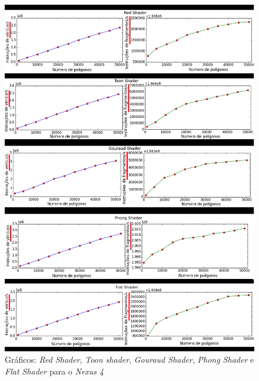 	\begin{figure}[hb]
	\centering
		\includegraphics[keepaspectratio=true,scale=0.55]{figuras/red_pt.png}
	\caption{Gráficos: \textit{Red Shader}, \textit{Toon shader}, \textit{Gouraud Shader},  \textit{Phong Shader} e  \textit{Flat Shader} para o \textit{Nexus 4}}
	\label{nexus1}
	\end{figure}

